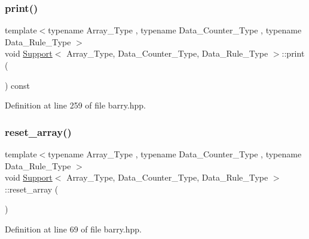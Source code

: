 \mbox{\label{classbarry_1_1_support_af87b2e85ec72e394387946023508e7fd}} 
\subsubsection{\texorpdfstring{print()}{print()}}
{\footnotesize\ttfamily template$<$typename Array\+\_\+\+Type , typename Data\+\_\+\+Counter\+\_\+\+Type , typename Data\+\_\+\+Rule\+\_\+\+Type $>$ \\
void \hyperlink{classbarry_1_1_support}{Support}$<$ Array\+\_\+\+Type, Data\+\_\+\+Counter\+\_\+\+Type, Data\+\_\+\+Rule\+\_\+\+Type $>$\+::print (\begin{DoxyParamCaption}{ }\end{DoxyParamCaption}) const\hspace{0.3cm}{\ttfamily [inline]}}



Definition at line 259 of file barry.\+hpp.

\mbox{\label{classbarry_1_1_support_a4f2860fd2e8e30703b91633a92ed7a58}} 
\subsubsection{\texorpdfstring{reset\+\_\+array()}{reset\_array()}\hspace{0.1cm}{\footnotesize\ttfamily [1/2]}}
{\footnotesize\ttfamily template$<$typename Array\+\_\+\+Type , typename Data\+\_\+\+Counter\+\_\+\+Type , typename Data\+\_\+\+Rule\+\_\+\+Type $>$ \\
void \hyperlink{classbarry_1_1_support}{Support}$<$ Array\+\_\+\+Type, Data\+\_\+\+Counter\+\_\+\+Type, Data\+\_\+\+Rule\+\_\+\+Type $>$\+::reset\+\_\+array (\begin{DoxyParamCaption}{ }\end{DoxyParamCaption})\hspace{0.3cm}{\ttfamily [inline]}}



Definition at line 69 of file barry.\+hpp.

\mbox{\label{classbarry_1_1_support_afb7ca8dbf350d233e677322d567dc98c}} 
